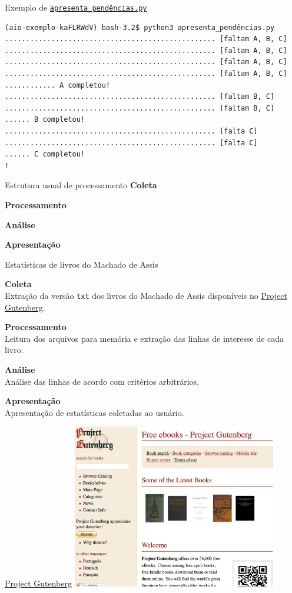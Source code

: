 \documentclass[12pt]{beamer}
\begin{document}
\begin{frame}[fragile]{Exemplo de \texttt{\href{https://github.com/ayharano/aio-exemplo/blob/master/apresenta\_pend\%C3\%AAncias.py}{apresenta\_pendências.py}}}
  \tiny{\begin{verbatim}(aio-exemplo-kaFLRWdV) bash-3.2$ python3 apresenta_pendências.py
.................................................. [faltam A, B, C]
.................................................. [faltam A, B, C]
.................................................. [faltam A, B, C]
.................................................. [faltam A, B, C]
............ A completou!
.................................................. [faltam B, C]
.................................................. [faltam B, C]
...... B completou!
.................................................. [falta C]
.................................................. [falta C]
...... C completou!
!\end{verbatim}}
\end{frame}

\begin{frame}[fragile]{Estrutura usual de processamento}
  \textbf{Coleta}

  \textbf{Processamento}

  \textbf{Análise}

  \textbf{Apresentação}
\end{frame}

\begin{frame}[fragile]{Estatísticas de livros do Machado de Assis}
  \small{
  \textbf{Coleta} \\
  Extração da versão \texttt{txt} dos livros do Machado de Assis disponíveis no \href{http://www.gutenberg.org/}{Project Gutenberg}.

  \textbf{Processamento} \\
  Leitura dos arquivos para memória e extração das linhas de interesse de cada livro.

  \textbf{Análise} \\
  Análise das linhas de acordo com critérios arbitrários.

  \textbf{Apresentação} \\
  Apresentação de estatísticas coletadas ao usuário.
  }
\end{frame}

\begin{frame}[fragile]{\href{http://www.gutenberg.org/}{Project Gutenberg}}
    \href{http://www.gutenberg.org/}{\includegraphics[width=9cm]{gutenberg_site}}
\end{frame}
\end{document}
